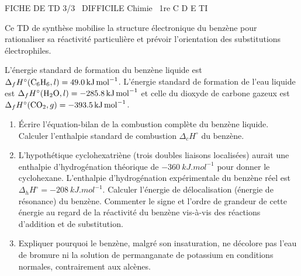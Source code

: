 \documentclass[11pt]{article}
\begin{document}
\begin{tcolorbox}[enhanced,colback=popink,colframe=popink,arc=10pt,boxrule=0pt,left=12pt,right=12pt,top=9pt,bottom=9pt]
{\color{white}\popxbold\small FICHE DE TD 3/3 \textbullet\ DIFFICILE \hfill Chimie \textbullet\ 1re C D E TI\par}
\end{tcolorbox}
\vspace{4pt}
Ce TD de synthèse mobilise la structure électronique du benzène pour rationaliser sa réactivité particulière et prévoir l'orientation des substitutions électrophiles.

\begin{exercice}
L'énergie standard de formation du benzène liquide est $\Delta_f H^\circ(\ce{C6H6}, l) = \SI{+49,0}{kJ.mol^{-1}}$. L'énergie standard de formation de l'eau liquide est $\Delta_f H^\circ(\ce{H2O}, l) = \SI{-285,8}{kJ.mol^{-1}}$ et celle du dioxyde de carbone gazeux est $\Delta_f H^\circ(\ce{CO2}, g) = \SI{-393,5}{kJ.mol^{-1}}$.
\begin{enumerate}
    \item Écrire l'équation-bilan de la combustion complète du benzène liquide. Calculer l'enthalpie standard de combustion $\Delta_c H^\circ$ du benzène.
    \item L'hypothétique cyclohexatriène (trois doubles liaisons localisées) aurait une enthalpie d'hydrogénation théorique de $\SI{-360}{kJ.mol^{-1}}$ pour donner le cyclohexane. L'enthalpie d'hydrogénation expérimentale du benzène réel est $\Delta_h H^\circ = \SI{-208}{kJ.mol^{-1}}$. Calculer l'énergie de délocalisation (énergie de résonance) du benzène. Commenter le signe et l'ordre de grandeur de cette énergie au regard de la réactivité du benzène vis-à-vis des réactions d'addition et de substitution.
    \item Expliquer pourquoi le benzène, malgré son insaturation, ne décolore pas l'eau de bromure ni la solution de permanganate de potassium en conditions normales, contrairement aux alcènes.
\end{enumerate}
\end{exercice}
\end{document}
